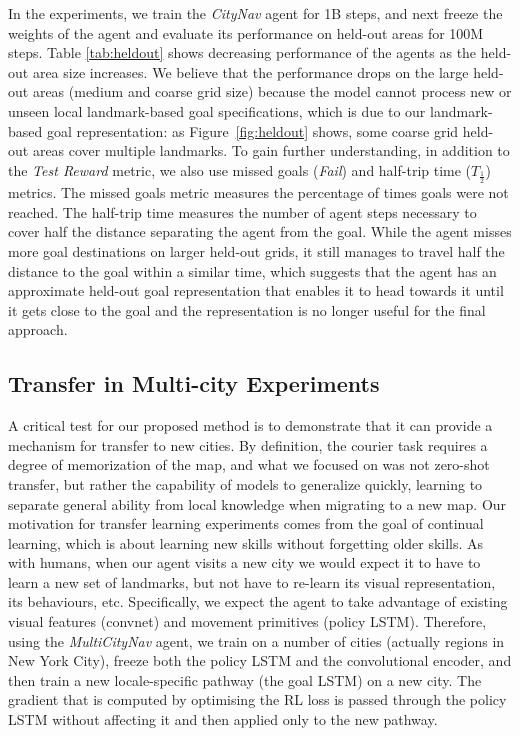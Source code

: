 In the experiments, we train the \emph{CityNav} agent for 1B steps, and next freeze the weights of the agent and evaluate its performance on held-out areas for 100M steps. Table \ref{tab:heldout} shows decreasing performance of the agents as the held-out area size increases. 
We believe that the performance drops on the large held-out areas (medium and coarse grid size) because the model cannot process new or unseen local landmark-based goal specifications, which is due to our landmark-based goal representation: as Figure~\ref{fig:heldout} shows, some coarse grid held-out areas cover multiple landmarks.
To gain further understanding, in addition to the \emph{Test Reward} metric, we also use missed goals (\emph{Fail}) and half-trip time ($T_{\frac{1}{2}}$) metrics. The missed goals metric measures the percentage of times goals were not reached. The half-trip time measures the number of agent steps necessary to cover half the distance separating the agent from the goal. While the agent misses more goal destinations on larger held-out grids, it still manages to travel half the distance to the goal within a similar time, which suggests that the agent has an approximate held-out goal representation that enables it to head towards it until it gets close to the goal and the representation is no longer useful for the final approach.

\subsection{Transfer in Multi-city Experiments}
\label{sec:transfer}
A critical test for our proposed method is to demonstrate that it can provide a mechanism for transfer to new cities. By definition, the courier task requires a degree of memorization of the map, and what we focused on was not zero-shot transfer, but rather the capability of models to generalize quickly, learning to separate general ability from local knowledge when migrating to a new map. Our motivation for transfer learning experiments comes from the goal of continual learning, which is about learning new skills without forgetting older skills.
As with humans, when our agent visits a new city we would expect it to have to learn a new set of landmarks, but not have to re-learn its visual representation, its behaviours, etc. Specifically, we expect the agent to take advantage of existing visual features (convnet) and movement primitives (policy LSTM). Therefore, using the \emph{MultiCityNav} agent, we train on a number of cities (actually regions in New York City), freeze both the policy LSTM and the convolutional encoder, and then train a new locale-specific pathway (the goal LSTM) on a new city. The gradient that is computed by optimising the RL loss is passed through the policy LSTM without affecting it and then applied only to the new pathway. 

